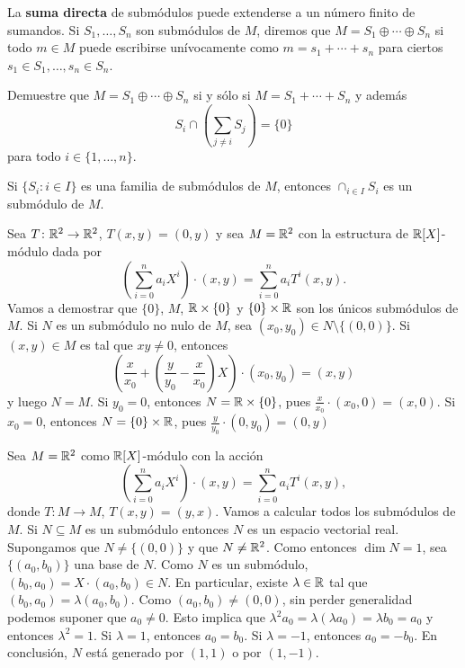 La \textbf{suma directa} de submódulos puede extenderse a un número finito de sumandos. 
Si $S_1,\dots,S_n$ son submódulos de $M$, diremos que
$M=S_1\oplus\cdots\oplus S_n$ si todo $m\in M$ puede escribirse unívocamente
como $m=s_1+\cdots+s_n$ para ciertos $s_1\in S_1,\dots,s_n\in S_n$. 

\begin{exercise}
Demuestre que $M=S_1\oplus\cdots\oplus S_n$ si y sólo si
$M=S_1+\cdots+S_n$ y además 
\[
S_i\cap\left(\sum_{j\ne i}S_j\right)=\{0\}
\]	
para todo $i\in\{1,\dots,n\}$.
\end{exercise}

\begin{exercise}
Si $\{S_i:i\in I\}$ es una familia de submódulos de $M$, entonces $\cap_{i\in I}S_i$ es un submódulo de $M$.
\end{exercise}

\begin{example}
Sea $T\colon\mathbb{R}^2\to\mathbb{R}^2$, $T(x,y)=(0,y)$ y sea $M=\mathbb{R}^2$ con la estructura de $\mathbb{R}[X]$-módulo dada por
\[
\left(\sum_{i=0}^n a_iX^i\right)\cdot (x,y)=\sum_{i=0}^n a_iT^i(x,y).
\]
Vamos a demostrar que
$\{0\}$, $M$, $\mathbb{R}\times\{0\}$ y $\{0\}\times\mathbb{R}$ son los únicos submódulos de $M$. Si $N$ es un submódulo no nulo de $M$, sea
$(x_0,y_0)\in N\setminus\{(0,0)\}$. Si $(x,y)\in M$ es tal que $xy\ne 0$, entonces
\[
\left(\frac{x}{x_0}+\left(\frac{y}{y_0}-\frac{x}{x_0}\right)X\right)\cdot (x_0,y_0)=(x,y) 
\]
y luego $N=M$. Si $y_0=0$, entonces $N=\mathbb{R}\times\{0\}$, pues $\frac{x}{x_0}\cdot (x_0,0)=(x,0)$. Si $x_0=0$, entonces
$N=\{0\}\times\mathbb{R}$, pues 
$\frac{y}{y_0}\cdot (0,y_0)=(0,y)$ 
\end{example}


\begin{example}
Sea $M=\mathbb{R}^2$ como $\mathbb{R}[X]$-módulo con la acción
\[
\left(\sum_{i=0}^n a_iX^i\right)\cdot (x,y)=\sum_{i=0}^n a_iT^i(x,y),
\]
donde $T\colon M\to M$, $T(x,y)=(y,x)$. 
Vamos a calcular todos los submódulos de $M$. 
Si $N\subseteq M$ es un submódulo entonces $N$ es un espacio vectorial real. Supongamos que $N\ne\{(0,0)\}$ y que $N\ne\mathbb{R}^2$. Como entonces $\dim N=1$, 
sea $\{(a_0,b_0)\}$ una base de $N$. Como $N$ es un submódulo,
$(b_0,a_0)=X\cdot (a_0,b_0)\in N$. En particular, existe $\lambda\in\mathbb{R}$ tal que $(b_0,a_0)=\lambda (a_0,b_0)$. Como $(a_0,b_0)\ne(0,0)$, sin perder generalidad
podemos suponer que $a_0\ne 0$. Esto implica que
$\lambda^2 a_0=\lambda (\lambda a_0)=\lambda b_0=a_0$ y entonces $\lambda^2=1$. Si $\lambda=1$, entonces
$a_0=b_0$. Si $\lambda=-1$, entonces $a_0=-b_0$. En conclusión, $N$ está generado por $(1,1)$ o por $(1,-1)$.  
\end{example}

